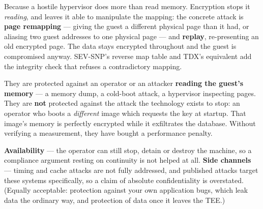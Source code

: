 \begin{ans}
  \item Because a hostile hypervisor does more than read memory. Encryption
        stops it \emph{reading}, and leaves it able to manipulate the mapping:
        the concrete attack is \textbf{page remapping} --- giving the guest a
        different physical page than it had, or aliasing two guest addresses to
        one physical page --- and \textbf{replay}, re-presenting an old
        encrypted page. The data stays encrypted throughout and the guest is
        compromised anyway. SEV-SNP's reverse map table and TDX's equivalent add
        the integrity check that refuses a contradictory mapping.
  \item They are protected against an operator or an attacker \textbf{reading
        the guest's memory} --- a memory dump, a cold-boot attack, a hypervisor
        inspecting pages. They are \textbf{not} protected against the attack the
        technology exists to stop: an operator who boots a \emph{different}
        image which requests the key at startup. That image's memory is
        perfectly encrypted while it exfiltrates the database. Without
        verifying a measurement, they have bought a performance penalty.
  \item \textbf{Availability} --- the operator can still stop, detain or destroy
        the machine, so a compliance argument resting on continuity is not
        helped at all. \textbf{Side channels} --- timing and cache attacks are
        not fully addressed, and published attacks target these systems
        specifically, so a claim of absolute confidentiality is
        overstated. (Equally acceptable: protection against your own application
        bugs, which leak data the ordinary way, and protection of data once it
        leaves the TEE.)
\end{ans}

